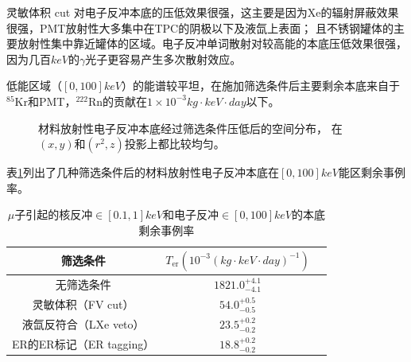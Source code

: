 灵敏体积 cut 对电子反冲本底的压低效果很强，这主要是因为$\mathrm{Xe}$的辐射屏蔽效果很强，PMT放射性大多集中在TPC的阴极以下及液氙上表面；
且不锈钢罐体的主要放射性集中靠近罐体的区域。电子反冲单词散射对较高能的本底压低效果很强，因为几百$\si{keV}$的$\gamma$光子更容易产生多次散射效应。

低能区域（$[0, 100]\si{keV}$）的能谱较平坦，在施加筛选条件后主要剩余本底来自于${}^{85}\mathrm{Kr}$和PMT，${}^{222}\mathrm{Rn}$的贡献在$1\times10^{-3}\si{kg}\cdot\si{keV}\cdot\si{day}$以下。

\begin{figure}
  \centering
  
  \caption{\label{fig:material_er_xyzr} 材料放射性电子反冲本底经过筛选条件压低后的空间分布，
  在$(x,y)$和$(r^2,z)$投影上都比较均匀。}
\end{figure}

表\ref{tab:cuts_material_remain}列出了几种筛选条件后的材料放射性电子反冲本底在$[0,100]\si{keV}$能区剩余事例率。

\begin{table}
  \centering
  \caption{$\mu$子引起的核反冲$\in[0.1,1]\si{keV}$和电子反冲$\in[0,100]\si{keV}$的本底剩余事例率}
  \begin{tabular}{ccc}
    \toprule
    筛选条件 & $T_\mathrm{er}\left(10^{-3}\left(\si{kg}\cdot\si{keV}\cdot\si{day}\right)^{-1}\right)$ \\
    \midrule
    无筛选条件 & $1821.0_{-4.1}^{+4.1}$ \\
    灵敏体积（FV cut） & $54.0_{-0.5}^{+0.5}$ \\
    液氙反符合（LXe veto） & $23.5_{-0.2}^{+0.2}$ \\
    ER的ER标记（ER tagging） & $18.8_{-0.2}^{+0.2}$ \\
    \bottomrule
  \end{tabular}
  \label{tab:cuts_material_remain}
\end{table}
